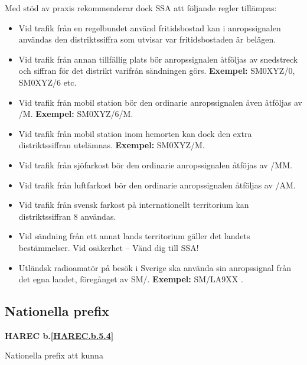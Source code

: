 Med stöd av praxis rekommenderar dock SSA att följande regler tillämpas:

\begin{itemize}
\item Vid trafik från en regelbundet använd fritidsbostad kan i
  anropssignalen användas den distriktssiffra som utvisar var
  fritidsbostaden är belägen.

\item Vid trafik från annan tillfällig plats bör anropssignalen
  åtföljas av snedstreck och siffran för det distrikt varifrån
  sändningen görs.
  \textbf{Exempel:} SM0XYZ/0, SM0XYZ/6 etc.

\item Vid trafik från mobil station bör den ordinarie anropssignalen
  även åtföljas av /M.
  \textbf{Exempel:} SM0XYZ/6/M.

\item Vid trafik från mobil station inom hemorten kan dock den extra
  distriktssiffran utelämnas.
  \textbf{Exempel:} SM0XYZ/M.

\item Vid trafik från sjöfarkost bör den ordinarie anropssignalen
 åtföjas av /MM.

\item Vid trafik från luftfarkost bör den ordinarie anropssignalen
  åtföljas av /AM.

\item Vid trafik från svensk farkost på internationellt territorium
 kan distriktssiffran 8 användas.

\item Vid sändning från ett annat lands territorium gäller det landets
  bestämmelser.
  Vid osäkerhet -- Vänd dig till SSA!

\item Utländsk radioamatör på besök i Sverige ska använda sin
  anropssignal från det egna landet, föregånget av SM/. \textbf{Exempel:} SM/LA9XX \cite{TR6101}.
\end{itemize}

\subsection{Nationella prefix}
\textbf{HAREC 
	b.\ref{HAREC.b.5.4}\label{myHAREC.b.5.4}
}

Nationella prefix att kunna

